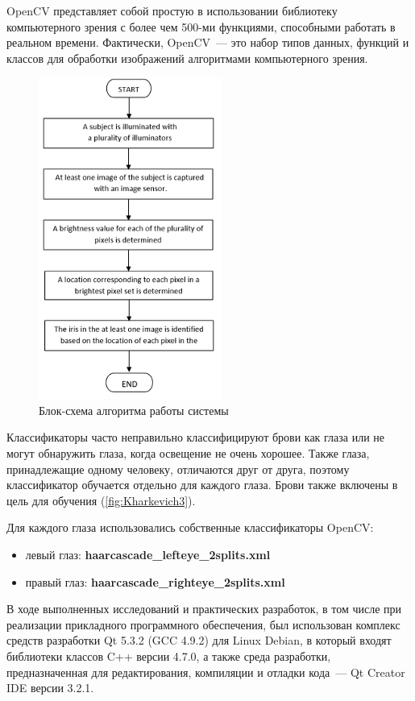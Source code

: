 \documentclass[10pt, a5paper]{article}
\begin{document}
OpenCV представляет собой простую в использовании библиотеку компьютерного зрения с более чем 500-ми функциями, способными работать в реальном времени. Фактически, OpenCV~--- это набор типов данных, функций и классов для обработки изображений алгоритмами компьютерного зрения.
\begin{center}
\begin{figure}[h!]
  \centering
  \includegraphics[width=6cm]{w_09_2018_Kharkevich2.png}
  \caption{Блок-схема алгоритма работы системы} 
  \label{fig:Kharkevich2}
\end{figure}
\end{center} 

Классификаторы часто неправильно классифицируют брови как глаза или не могут обнаружить глаза, когда освещение не очень хорошее. Также глаза, принадлежащие одному человеку, отличаются друг от друга, поэтому классификатор обучается отдельно для каждого глаза. Брови также включены в цель для обучения (\ref{fig:Kharkevich3}).

Для каждого глаза использовались собственные классификаторы OpenCV:
\begin{itemize}
\item левый глаз: \textbf{haarcascade\_lefteye\_2splits.xml}
\item правый глаз: \textbf{haarcascade\_righteye\_2splits.xml}
\end{itemize}
В ходе выполненных исследований и практических разработок, в том числе при реализации прикладного программного обеспечения, был использован комплекс средств разработки Qt 5.3.2 (GCC 4.9.2) для Linux Debian, в который входят библиотеки классов C++ версии 4.7.0, а также среда разработки, предназначенная для редактирования, компиляции и отладки кода~--- Qt Creator IDE версии 3.2.1.
\end{document}
